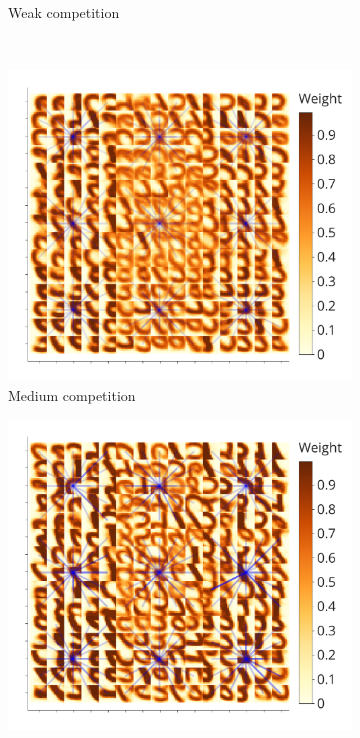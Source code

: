 \documentclass[a4paper,10pt]{article}
\begin{document}
\begin{figure}
\begin{subfigure}{0.45\textwidth}
    \caption{Weak competition}
    \label{fig:medium_bad_competition_distribution}
\end{subfigure}
\\
\begin{subfigure}{0.45\textwidth}
    \includegraphics[width=\textwidth,keepaspectratio=true]{competition_on_XY_medium_good.pdf}
    \caption{Medium competition}
    \label{fig:medium_good_competition_distribution}
\end{subfigure}
\begin{subfigure}{0.45\textwidth} 
    \includegraphics[width=\textwidth,keepaspectratio=true]{competition_on_XY_best.pdf}

\end{subfigure}
\end{figure}
\end{document}
